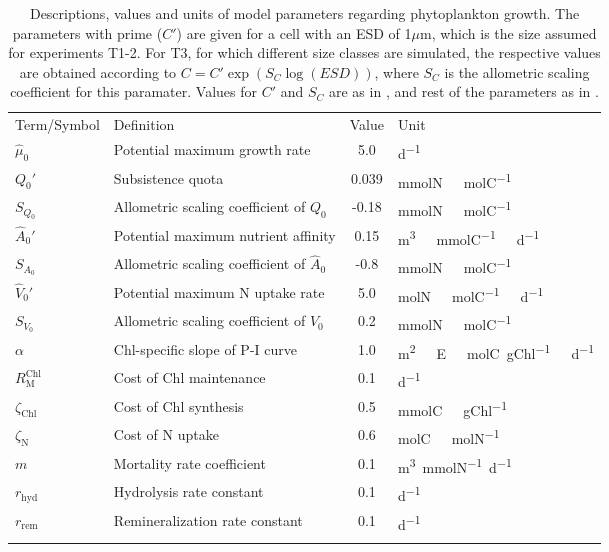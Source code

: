\documentclass[gmd, manuscript]{copernicus}
\begin{document}
\begin{table*}[htb]
  \caption{ Descriptions, values and units of model parameters regarding phytoplankton growth. The parameters with prime ($C'$) are given for a cell with an ESD of 1$\mu$m, which is the size assumed for experiments T1-2. For T3, for which different size classes are simulated, the respective values are obtained according to $C=C'\exp{(S_C \log (ESD))}$, where $S_C$ is the allometric scaling coefficient for this paramater. Values for $C'$ and $S_C$ are as in \citet{Smith2016}, and rest of the parameters as in \citet{Kerimoglu2021}. \label{T.pars}}
  \begin{tabular}{l l c l}
    \tophline
    Term/Symbol         & Definition                        & Value     & Unit\\
    \middlehline
    $\hat{\mu}_0$   & Potential maximum growth rate         & 5.0       & \unit{d^{-1}}\\
    $Q_0'$  & Subsistence quota                     & 0.039     & \unit{mmolN\ molC^{-1}}\\
    $S_{Q_0}$  & Allometric scaling coefficient of $Q_0$       & -0.18     & \unit{mmolN\ molC^{-1}}\\
    $\hat{A}_0'$     & Potential maximum nutrient affinity   & 0.15       & \unit{m^3\ mmolC^{-1}\ d^{-1}}\\
    $S_{A_0}$  & Allometric scaling coefficient of $\hat{A}_0$        & -0.8     & \unit{mmolN\ molC^{-1}}\\
    $\hat{V}_0'$     & Potential maximum N uptake rate       & 5.0       & \unit{molN\ molC^{-1}\ d^{-1}}\\
    $S_{V_0}$  & Allometric scaling coefficient of $\hat{V}_0$        & 0.2     & \unit{mmolN\ molC^{-1}}\\
    $\alpha$           & Chl-specific slope of P-I curve    & 1.0       & \unit{m^2\ E\ molC gChl^{-1}\ d^{-1}}\\
    $R^{\text{Chl}}_{\text{M}}$     & Cost of Chl maintenance   & 0.1       & \unit{d^{-1}}\\
    $\zeta_{\text{Chl}}$   & Cost of Chl synthesis  & 0.5       & \unit{mmolC\ gChl^{-1}}\\
    $\zeta_{\text{N}}$     & Cost of N uptake               & 0.6       & \unit{molC\ molN^{-1}}\\
    $m$                & Mortality rate coefficient        & 0.1   & \unit{m^{3} mmolN^{-1} d^{-1}} \\
    $r_{\text{hyd}}$   & Hydrolysis rate constant          & 0.1   & \unit{d^{-1}} \\
    $r_{\text{rem}}$   & Remineralization rate constant    & 0.1   & \unit{d^{-1}} \\
    \bottomhline
  \end{tabular}
  \belowtable{} %
\end{table*}
\end{document}
